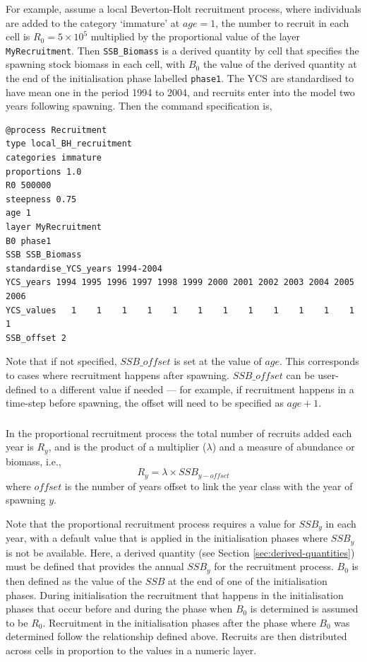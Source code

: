 For example, assume a local Beverton-Holt recruitment process, where individuals are added to the category `immature' at $age=1$, the number to recruit in each cell is $R_0=5 \times 10^5$ multiplied by the proportional value of the layer \texttt{MyRecruitment}. Then \texttt{SSB\_Biomass} is a derived quantity by cell that specifies the spawning stock biomass in each cell, with $B_0$ the value of the derived quantity at the end of the initialisation phase labelled \texttt{phase1}. The YCS are standardised to have mean one in the period 1994 to 2004, and recruits enter into the model two years following spawning. Then the command specification is,
{\small{\begin{verbatim}
@process Recruitment
type local_BH_recruitment
categories immature
proportions 1.0
R0 500000
steepness 0.75
age 1
layer MyRecruitment
B0 phase1
SSB SSB_Biomass
standardise_YCS_years 1994-2004
YCS_years 1994 1995 1996 1997 1998 1999 2000 2001 2002 2003 2004 2005 2006
YCS_values   1    1    1    1    1    1    1    1    1    1    1    1    1
SSB_offset 2
\end{verbatim}}}

Note that if not specified, $SSB\_offset$ is set at the value of $age$. This corresponds to cases where recruitment happens after spawning. $SSB\_offset$ can be user-defined to a different value if needed --- for example, if recruitment happens in a time-step before spawning, the offset will need to be specified as $age + 1$.

\subsubsection*{}

In the proportional recruitment process the total number of recruits added each year is $R_y$, and is the product of a multiplier ($\lambda$) and a measure of abundance or biomass, i.e.,
\begin{equation}
  R_y = \lambda \times SSB_{y-offset}
\end{equation}
 where $offset$ is the number of years offset to link the year class with the year of spawning $y$.

Note that the proportional recruitment process requires a value for $SSB_y$ in each year, with a default value that is applied in the initialisation phases where $SSB_y$ is not be available. Here, a derived quantity (see Section \ref{sec:derived-quantities}) must be defined that provides the annual $SSB_y$ for the recruitment process. $B_0$ is then defined as the value of the $SSB$ at the end of one of the initialisation phases. During initialisation the recruitment that happens in the initialisation phases that occur before and during the phase when $B_0$ is determined is assumed to be $R_0$. Recruitment in the initialisation phases after the phase where $B_0$ was determined follow the relationship defined above. Recruits are then distributed across cells in proportion to the values in a numeric layer. 

